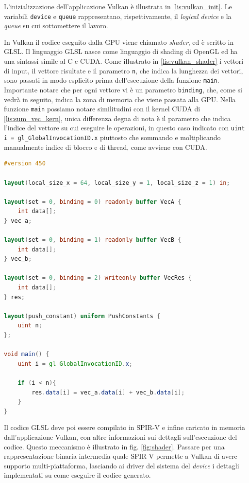 L'inizializzazione dell'applicazione Vulkan è illustrata in \ref{lis:vulkan_init}. Le variabili \verb|device| e \verb|queue| rappresentano, rispettivamente, il \textit{logical device} e la \textit{queue} su cui sottomettere il lavoro.

In Vulkan il codice eseguito dalla \gls{GPU} viene chiamato \textit{shader}, ed è scritto in \gls{GLSL}. Il linguaggio \gls{GLSL} nasce come linguaggio di shading di OpenGL ed ha una sintassi simile al C e \gls{CUDA}. Come illustrato in \ref{lis:vulkan_shader} i vettori di input, il vettore risultate e il parametro \verb|n|, che indica la lunghezza dei vettori, sono passati in modo esplicito prima dell'esecuzione della funzione \verb|main|. Importante notare che per ogni vettore vi è un parametro \verb|binding|, che, come si vedrà in seguito, indica la zona di memoria che viene passata alla \gls{GPU}. Nella funzione \verb|main| possiamo notare similitudini con il kernel \gls{CUDA} di \ref{lis:sum_vec_kern}, unica differenza degna di nota è il parametro che indica l'indice del vettore su cui eseguire le operazioni, in questo caso indicato con \verb|uint i = gl_GlobalInvocationID.x| piuttosto che sommando e moltiplicando manualmente indice di blocco e di thread, come avviene con \gls{CUDA}.

\newpage
\vspace{5mm}
\begin{lstlisting}[language=GLSL, caption=Shader GLSL di somma di vettori, label=lis:vulkan_shader]
#version 450

layout(local_size_x = 64, local_size_y = 1, local_size_z = 1) in;

layout(set = 0, binding = 0) readonly buffer VecA {
    int data[];
} vec_a;

layout(set = 0, binding = 1) readonly buffer VecB {
    int data[];
} vec_b;

layout(set = 0, binding = 2) writeonly buffer VecRes {
    int data[];
} res;

layout(push_constant) uniform PushConstants {
    uint n;
};

void main() {
    uint i = gl_GlobalInvocationID.x;

    if (i < n){
        res.data[i] = vec_a.data[i] + vec_b.data[i];
    }
}
\end{lstlisting}
\vspace{5mm}

Il codice \gls{GLSL} deve poi essere compilato in \gls{SPIR-V} e infine caricato in memoria dall'applicazione Vulkan, con altre informazioni sui dettagli sull'esecuzione del codice. Questo meccanismo è illustrato in fig. \ref{fig:shader}. Passare per una rappresentazione binaria intermedia quale \gls{SPIR-V} permette a Vulkan di avere supporto multi-piattaforma, lasciando ai driver del sistema del \textit{device} i dettagli implementati su come eseguire il codice generato.


